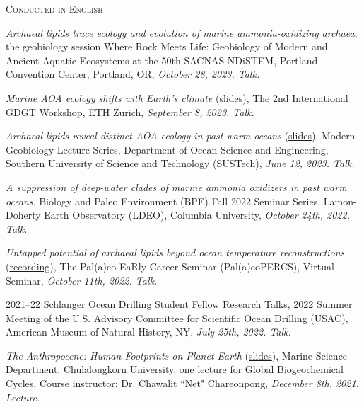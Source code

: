 \documentclass[10pt, letter]{article}
\newcommand{\margintext}[1]{\marginnote{\normalsize\textbf #1 |}}
\begin{document}
\bigskip
\margintext{Invited Talks \& Lectures}
\textsc{Conducted in English}
\begin{etaremune}

\item \textit{Archaeal lipids trace ecology and evolution of marine ammonia-oxidizing archaea}, the geobiology session Where Rock Meets Life: Geobiology of Modern and Ancient Aquatic Ecosystems at the 50th SACNAS NDiSTEM, Portland Convention Center, Portland, OR, \textit{October 28, 2023. Talk.}

\item \textit{Marine AOA ecology shifts with Earth’s climate} (\href{https://tamucs-my.sharepoint.com/:b:/g/personal/rrattan_tamu_edu/EZQsnDcppXpAkxq9H8E_L1YBK_Jnd2zL1lPQwsRLIZZ_xw?e=ilpAa1}{slides}), The 2nd International GDGT Workshop, ETH Zurich, \textit{September 8, 2023. Talk.}

\item \textit{Archaeal lipids reveal distinct AOA ecology in past warm oceans} (\href{https://tamucs-my.sharepoint.com/:b:/g/personal/rrattan_tamu_edu/ET9FxsRS79dBv4giDLNmCKIB0X_tnPspwI18D1e8uKEFLw?e=6On32v}{slides}), Modern Geobiology Lecture Series, Department of Ocean Science and Engineering, Southern University of Science and Technology (SUSTech), \textit{June 12, 2023. Talk.}

\item \textit{A suppression of deep-water clades of marine ammonia oxidizers in past warm oceans}, Biology and Paleo Environment (BPE) Fall 2022 Seminar Series, Lamon-Doherty Earth Observatory (LDEO), Columbia University, \textit{October 24th, 2022. Talk.}

\item \textit{Untapped potential of archaeal lipids beyond ocean temperature reconstructions} (\href{https://www.youtube.com/watch?v=95o7ogv_T9I}{recording}), The Pal(a)eo EaRly Career Seminar (Pal(a)eoPERCS), Virtual Seminar, \textit{October 11th, 2022. Talk.}

\item 2021–22 Schlanger Ocean Drilling Student Fellow Research Talks, 2022 Summer Meeting of the U.S. Advisory Committee for Scientific Ocean Drilling (USAC), American Museum of Natural History, NY, \textit{July 25th, 2022. Talk.}

\item \textit{The Anthropocene: Human Footprints on Planet Earth} (\href{https://docs.google.com/presentation/d/1XTTknlXZghoFSpxdI-8KNPqmwrOvbwUQ9sDqNNvJDf0/edit?usp=sharing}{slides}), Marine Science Department, Chulalongkorn University, one lecture for Global Biogeochemical Cycles, Course instructor: Dr. Chawalit ``Net" Chareonpong, \textit{December 8th, 2021. Lecture.}
\end{etaremune}
\end{document}
